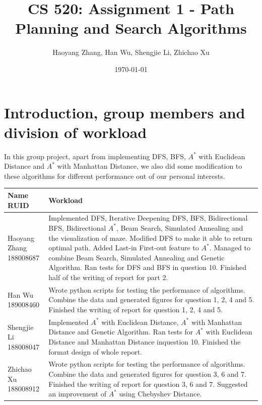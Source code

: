 \documentclass[letter]{article}
\title{CS 520: Assignment 1 - Path Planning and Search Algorithms}
\author{Haoyang Zhang, Han Wu, Shengjie Li, Zhichao Xu}
\date{\today}
\begin{document}
\maketitle

\section{Introduction, group members and division of workload}
\label{sec:Introduction}

In this group project, apart from implementing DFS, BFS, $ A^* $ with Euclidean Distance and $ A^* $ with Manhattan Distance, we also did some modification to these algorithms for different performance out of our personal interests.  \\
\begin{tabular}{| p{2.5cm} | p{11.5cm} |}
	\hline
	\makecell[c]{Name \\ RUID} & Workload \\
	\hline
	\makecell[c]{Haoyang Zhang \\ 188008687} & {Implemented DFS, Iterative Deepening DFS, BFS, Bidirectional BFS, Bidirectional $ A^* $, Beam Search, Simulated Annealing and the visualization of maze. Modified DFS to make it able to return optimal path. Added Last-in First-out feature to $ A^* $. Managed to combine Beam Search, Simulated Annealing and Genetic Algorithm. Ran tests for DFS and BFS in question 10. Finished half of the writing of report for part 2.} \\
	\hline
	\makecell[c]{Han Wu \\ 189008460} & {Wrote python scripts for testing the performance of algorithms. Combine the data and generated figures for question 1, 2, 4 and 5. Finished the writing of report for question 1, 2, 4 and 5.} \\
	\hline
	\makecell[c]{Shengjie Li \\ 188008047} & {Implemented $ A^* $ with Euclidean Distance, $ A^* $ with Manhattan Distance and Genetic Algorithm. Ran tests for $ A^* $ with Euclidean Distance and Manhattan Distance inquestion 10. Finished the format design of whole report. } \\
	\hline
	\makecell[c]{Zhichao Xu \\ 188008912} & {Wrote python scripts for testing the performance of algorithms. Combine the data and generated figures for question 3, 6 and 7. Finished the writing of report for question 3, 6 and 7. Suggested an improvement of $ A^* $ using Chebyshev Distance.} \\
	\hline
\end{tabular}
\end{document}
